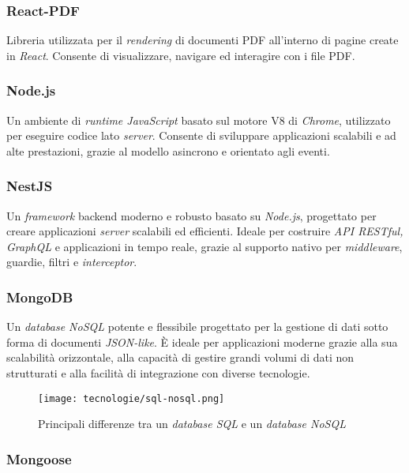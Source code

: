 \subsubsection{React-PDF}

Libreria utilizzata per il \textit{rendering} di documenti PDF all’interno di pagine create in \textit{React}.
Consente di visualizzare, navigare ed interagire con i file PDF.

\subsubsection{Node.js}

Un ambiente di \textit{runtime JavaScript} basato sul motore V8 di \textit{Chrome}, utilizzato per eseguire codice lato \textit{server}. 
Consente di sviluppare applicazioni scalabili e ad alte prestazioni, grazie al modello asincrono e orientato agli eventi.

\subsubsection{NestJS}

Un \textit{framework} \gls{backend} moderno e robusto basato su \textit{Node.js}, progettato per creare applicazioni \textit{server} scalabili ed efficienti.
Ideale per costruire \textit{API RESTful, GraphQL} e applicazioni in tempo reale, grazie al supporto nativo per \textit{middleware}, guardie, filtri e \textit{interceptor}.
\pagebreak
\subsubsection{MongoDB}

Un \textit{database NoSQL} potente e flessibile progettato per la gestione di dati sotto forma di documenti \textit{JSON-like}. 
È ideale per applicazioni moderne grazie alla sua scalabilità orizzontale, alla capacità di gestire grandi volumi di dati non strutturati e alla facilità di integrazione con diverse tecnologie.

\begin{figure}[H]
    \label{fig:sql-nosql}
    \centering
    \texttt{[image: tecnologie/sql-nosql.png]}
    \caption{Principali differenze tra un \textit{database SQL} e un \textit{database NoSQL}}
\end{figure}

\subsubsection{Mongoose}

